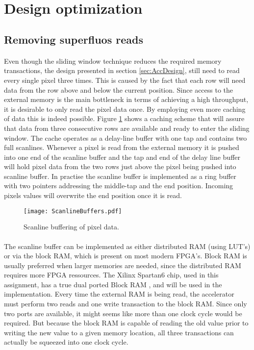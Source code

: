 \section{Design optimization}
\label{sec:Optimization}
\subsection*{Removing superfluos reads}
\label{sec:memaccess}
\paragraph*{}
Even though the sliding window technique reduces the required memory transactions, the design presented in section \ref{sec:AccDesign}, still need to read every single pixel three times. This is caused by the fact that each row will need data from the row above and below the current position. Since access to the external memory is the main bottleneck in terms of achieving a high throughput, it is desirable to only read the pixel data once. By employing even more caching of data this is indeed possible. Figure \ref{fig:ScanlineBuffers} shows a caching scheme that will assure that data from three consecutive rows are available and ready to enter the sliding window. The cache operates as a delay-line buffer with one tap and contains two full scanlines. Whenever a pixel is read from the external memory it is pushed into one end of the scanline buffer and the tap and end of the delay line buffer will hold pixel data from the two rows just above the pixel being pushed into  scanline buffer. In practise the scanline buffer is implemented as a ring buffer with two pointers addressing the middle-tap and the end position. 
Incoming pixels values will overwrite the end position once it is read.

\begin{figure}[H]
	\centering
	\texttt{[image: ScanlineBuffers.pdf]}
	\caption{Scanline buffering of pixel data.}
	\label{fig:ScanlineBuffers}
\end{figure}

\paragraph*{}
The scanline buffer can be implemented as either distributed RAM (using LUT's) or via the block RAM, which is present on most modern FPGA's. Block RAM is usually preferred when larger memories are needed, since the distributed RAM requires more FPGA ressources. The Xilinx Spartan6 chip, used in this assignment, has a true dual ported Block RAM \cite{Xilinx:UG383}, and will be used in the implementation.
Every time the external RAM is being read, the accelerator must perform two reads and one write transaction to the block RAM. Since only two ports are available, it might seems like more than one clock cycle would be required. But because the block RAM is capable of reading the old value prior to writing the new value to a given memory location, all three transactions can actually be squeezed into one clock cycle. 

